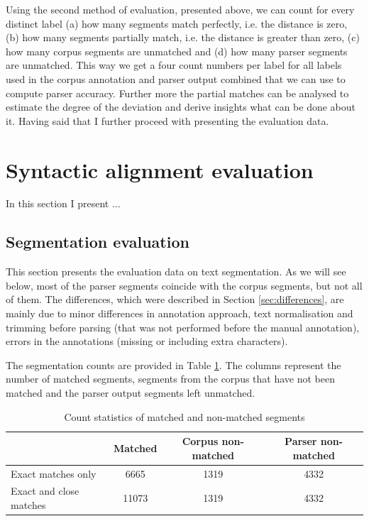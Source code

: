    Using the second method of evaluation, presented above, we can count for every distinct label (a) how many segments match perfectly, i.e. the distance is zero, (b) how many segments partially match, i.e. the distance is greater than zero, (c) how many corpus segments are unmatched and (d) how many parser segments are unmatched. This way we get a four count numbers per label for all labels used in the corpus annotation and parser output combined that we can use to compute parser accuracy. Further more the partial matches can be analysed to estimate the degree of the deviation and derive insights what can be done about it. Having said that I further proceed with presenting the evaluation data. 

\section{Syntactic alignment evaluation}
    In this section I present ...
    
\subsection{Segmentation evaluation}
\label{sec:segmentation-evaluation}
    
    This section presents the evaluation data on text segmentation. As we will see below, most of the parser segments coincide with the corpus segments, but not all of them. The differences, which were described in Section \ref{sec:differences}, are mainly due to minor differences in annotation approach, text normalisation and trimming before parsing (that was not performed before the manual annotation), errors in the annotations (missing or including extra characters). 
    
    The segmentation counts are provided in Table \ref{tab:segmentation-stats}. The columns represent  the number of matched segments, segments from the corpus that have not been matched and the parser output segments left unmatched.
    
    \begin{table}[!ht]
    \centering
    \begin{tabular}{lccc}
    \toprule
    {} &  Matched &  Corpus non-matched &  Parser non-matched \\
    \midrule
    Exact matches only &     6665 &                1319 &                4332 \\
    Exact and close matches &    11073 &                1319 &                4332 \\
    \bottomrule
    \end{tabular}
    \caption{Count statistics of matched and non-matched segments}
    \label{tab:segmentation-stats}
    \end{table}
    

